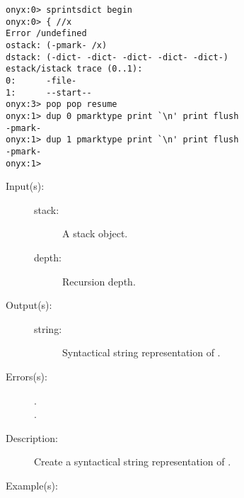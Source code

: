 \begin{description}
\begin{description}
\begin{verbatim}
onyx:0> sprintsdict begin
onyx:0> { //x
Error /undefined
ostack: (-pmark- /x)
dstack: (-dict- -dict- -dict- -dict- -dict-)
estack/istack trace (0..1):
0:      -file-
1:      --start--
onyx:3> pop pop resume
onyx:1> dup 0 pmarktype print `\n' print flush
-pmark-
onyx:1> dup 1 pmarktype print `\n' print flush
-pmark-
onyx:1>
		\end{verbatim}
	\end{description}
\label{sprintsdict:stacktype}
\item[{\onyxop{stack depth}{stacktype}{string}}: ]
	\begin{description}\item[]
	\item[Input(s): ]
		\begin{description}\item[]
		\item[stack: ]
			A stack object.
		\item[depth: ]
			Recursion depth.
		\end{description}
	\item[Output(s): ]
		\begin{description}\item[]
		\item[string: ]
			Syntactical string representation of .
		\end{description}
	\item[Errors(s): ]
		\begin{description}\item[]
		\item[.]
		\item[.]
		\end{description}
	\item[Description: ]
		Create a syntactical string representation of .
	\item[Example(s): ]\begin{verbatim}


\end{verbatim}
\end{description}
\end{description}
